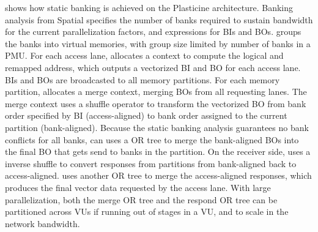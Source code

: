  shows how static banking is achieved on the Plasticine architecture.
Banking analysis from Spatial specifies the number of banks required to sustain bandwidth for the
current parallelization factors, and expressions for BIs and BOs. 
\name groups the banks into virtual memories, with group size limited by number of banks in a PMU.
For each access lane, \name allocates a context to compute the logical and remapped address, which
outputs a vectorized BI and BO for each access lane. BIs and BOs are broadcasted to all memory partitions.
For each memory partition, \name allocates a merge context, merging BOs from all requesting lanes.
The merge context uses a shuffle operator to transform the vectorized BO from bank order specified by BI
(access-aligned) to bank order assigned to the current partition (bank-aligned).
Because the static banking analysis guarantees no bank conflicts for all banks,
\name can uses a OR tree to merge the bank-aligned BOs into the final BO that gets send to
banks in the partition. On the receiver side, \name uses a inverse shuffle to convert responses from
partitions from bank-aligned back to access-aligned.
\name uses another OR tree to merge the access-aligned responses, which produces the final vector data requested
by the access lane.
With large parallelization, both the merge OR tree and the respond OR tree can be
partitioned across VUs if running out of stages in a VU, and to scale in the network bandwidth.




